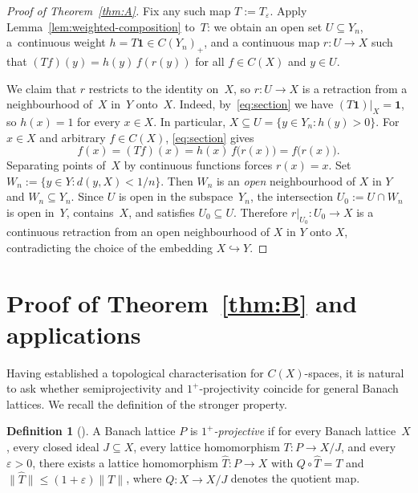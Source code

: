 \documentclass[11pt]{amsart}
\renewcommand{\le}{\leqslant}
\numberwithin{equation}{section}
\theoremstyle{definition}
\newtheorem{definition}[theorem]{Definition}
\theoremstyle{remark}
\theoremstyle{plain}
\begin{document}
\begin{proof}[Proof of Theorem~\ref{thm:A}]
Fix any such map $T:=T_\varepsilon$.
Apply Lemma~\ref{lem:weighted-composition} to~$T$: we obtain
an open set $U\subseteq Y_n$,
a~continuous weight $h=T\mathbf{1}\in C(Y_n)_+$,
and a continuous map $r\colon U\to X$ such that
$(Tf)(y)=h(y)\,f(r(y))$ for all $f\in C(X)$ and $y\in U$.

We claim that $r$ restricts to the identity on~$X$, so $r\colon U\to X$ is a retraction
from a neighbourhood of~$X$ in~$Y$ onto~$X$.
Indeed, by~\eqref{eq:section} we have $(T\mathbf{1})|_X=\mathbf{1}$, so
$h(x)=1$ for every $x\in X$.
In particular, $X\subseteq U=\{y\in Y_n:h(y)>0\}$.
For $x\in X$ and arbitrary $f\in C(X)$, \eqref{eq:section} gives
\[
f(x)=(Tf)(x)=h(x)\,f\bigl(r(x)\bigr)=f\bigl(r(x)\bigr).
\]
Separating points of~$X$ by continuous functions forces $r(x)=x$.
Set $W_n:=\{y\in Y: d(y,X)<1/n\}$.
Then $W_n$ is an \emph{open} neighbourhood of $X$ in $Y$ and $W_n\subseteq Y_n$.
Since $U$ is open in the subspace~$Y_n$, the intersection $U_0:=U\cap W_n$
is open in~$Y$, contains~$X$, and satisfies $U_0\subseteq U$.
Therefore $r|_{U_0}\colon U_0\to X$ is a continuous retraction from an open neighbourhood
of $X$ in $Y$ onto $X$, contradicting the choice of the embedding $X\hookrightarrow Y$.
\end{proof}

\section{Proof of Theorem~\ref{thm:B} and applications}\label{sec:thmB}

Having established a topological characterisation for $C(X)$-spaces,
it is natural to ask whether semiprojectivity and $1^+$-projectivity coincide
for general Banach lattices.
We recall the definition of the stronger property.

\begin{definition}[{\cite[Definition~10.1]{dpw}}]\label{def:projective}
A Banach lattice $P$ is \emph{$1^+$-projective} if for every Banach lattice~$X$,
every closed ideal $J\subseteq X$,
every lattice homomorphism $T\colon P\to X/J$, and every $\varepsilon>0$,
there exists a lattice homomorphism $\widehat T\colon P\to X$ with
$Q\circ \widehat T=T$ and $\|\widehat T\|\le (1+\varepsilon)\|T\|$,
where $Q\colon X\to X/J$ denotes the quotient map.
\end{definition}
\end{document}
